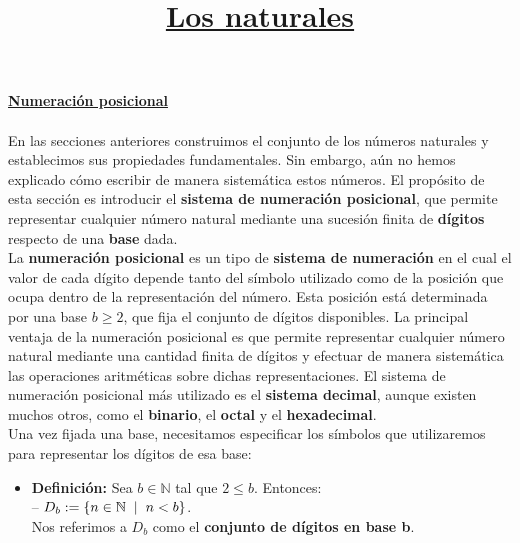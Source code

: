 \documentclass[10 pt]{article}
\title{\textbf{\underline{Los naturales}}}
\author{}
\date{}
\begin{document}
\pagestyle{empty}
\maketitle
\thispagestyle{empty}

\section*{}

\LARGE{\textbf{\underline{Numeración posicional}}}\\ \\

\Large{En las secciones anteriores construimos el conjunto de los números naturales y establecimos sus propiedades fundamentales. Sin embargo, aún no hemos explicado cómo escribir de manera sistemática estos números. El propósito de esta sección es introducir el\textbf{ sistema de numeración posicional}, que permite representar cualquier número natural mediante una sucesión finita de \textbf{dígitos} respecto de una \textbf{base} dada.} \\

\Large{La \textbf{numeración posicional} es un tipo de \textbf{sistema de numeración} en el cual el valor de cada dígito depende tanto del símbolo utilizado como de la posición que ocupa dentro de la representación del número. Esta posición está determinada por una base $b \geq 2$, que fija el conjunto de dígitos disponibles. La principal ventaja de la numeración posicional es que permite representar cualquier número natural mediante una cantidad finita de dígitos y efectuar de manera sistemática las operaciones aritméticas sobre dichas representaciones. El sistema de numeración posicional más utilizado es el \textbf{sistema decimal}, aunque existen muchos otros, como el \textbf{binario}, el \textbf{octal} y el \textbf{hexadecimal}.} \\

\Large{Una vez fijada una base, necesitamos especificar los símbolos que utilizaremos para representar los dígitos de esa base:} \\

\begin{itemize}
    \item \Large{\textbf{Definición:} Sea $b \in  \mathbb N$ tal que $2 \leq b$. Entonces: \\

    -- $D_{b}:=\{n \in \mathbb N \hspace{0.2 cm}|\hspace{0.2 cm}n<b\}$. \\

    Nos referimos a $D_{b}$ como el \textbf{conjunto de dígitos en base b}.} \\
\end{itemize}
\end{document}
